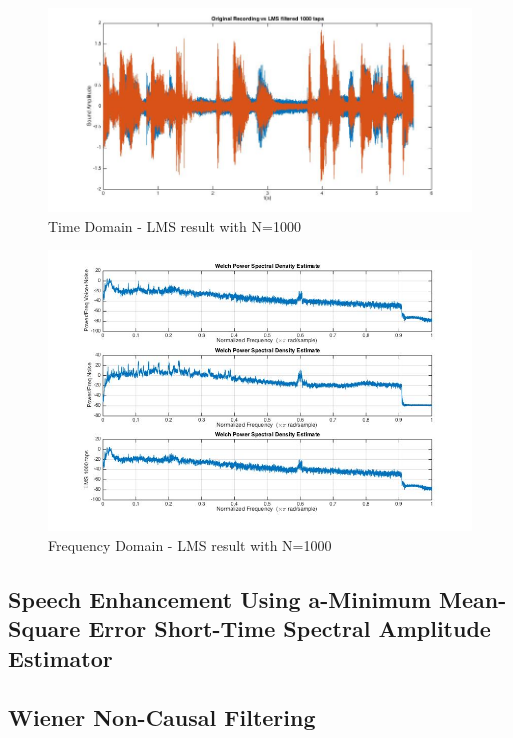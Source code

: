 \documentclass[11pt,a4paper,spanish]{book}  %
\theoremstyle{definition}  %
\theoremstyle{plain}  %
\theoremstyle{remark}  %
\begin{document}
		\begin{figure}[h]
		\centering
		\includegraphics[width=15cm]{images/theory/lms1000tapstime.jpg}
		\caption{Time Domain - LMS result with N=1000}
		\label{fig:lmstime1000}
		\end{figure}
		
		
		\begin{figure}[h]
		\centering
		\includegraphics[width=15cm]{images/theory/lms100tapsfreq.jpg}
		\caption{Frequency Domain - LMS result with N=1000}
		\label{fig:lmsfreq1000}
		\end{figure}
		
		
	\subsection{Speech Enhancement Using a-Minimum Mean- Square Error Short-Time Spectral Amplitude Estimator}
	\label{sec:enhancement}


	\subsection{Wiener Non-Causal Filtering}
	
\end{document}
